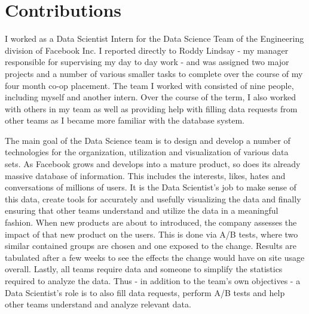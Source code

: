 \section*{Contributions} %
\label{sec:contributions}

I worked as a Data Scientist Intern for the Data Science Team of the Engineering division of Facebook Inc.  I reported directly to Roddy Lindsay - my manager responsible for supervising my day to day work - and was assigned two major projects and a number of various smaller tasks to complete over the course of my four month co-op placement.  The team I worked with consisted of nine people, including myself and another intern. Over the course of the term, I also worked with others in my team as well as providing help with filling data requests from other teams as I became more familiar with the database system.\newline

The main goal of the Data Science team is to design and develop a number of technologies for the organization, utilization and visualization of various data sets.  As Facebook grows and develops into a mature product, so does its already massive database of information.  This includes the interests, likes, hates and conversations of millions of users.  It is the Data Scientist's job to make sense of this data, create tools for accurately and usefully visualizing the data and finally ensuring that other teams understand and utilize the data in a meaningful fashion.  When new products are about to introduced, the company assesses the impact of that new product on the users. This is done via A/B tests, where two similar contained groups are chosen and one exposed to the change. Results are tabulated after a few weeks to see the effects the change would have on site usage overall. Lastly, all teams require data and someone to simplify the statistics required to analyze the data. Thus - in addition to the team's own objectives - a Data Scientist's role is to also fill data requests, perform A/B tests and help other teams understand and analyze relevant data.\newline

